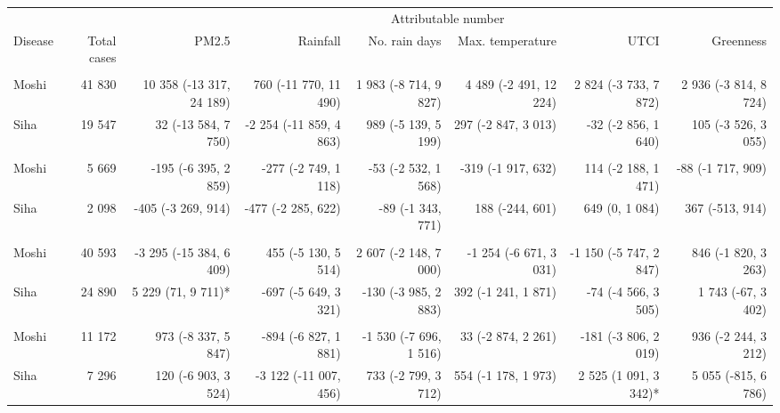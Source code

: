 \begin{table}[t]
\fontsize{12.0pt}{14.4pt}\selectfont
\begin{tabular*}{\linewidth}{@{\extracolsep{\fill}}l|rrrrrrr}
\toprule
 &  & \multicolumn{6}{c}{Attributable number} \\ 
\cmidrule(lr){3-8}
Disease & Total cases & PM2.5 & Rainfall & No. rain days & Max. temperature & UTCI & Greenness \\ 
\midrule\addlinespace[2.5pt]
\multicolumn{8}{l}{Pneumonia, Severe} \\[2.5pt] 
\midrule\addlinespace[2.5pt]
Moshi & 41 830 & 10 358 (-13 317, 24 189)  & 760 (-11 770, 11 490)  & 1 983 (-8 714, 9 827)  & 4 489 (-2 491, 12 224)  & 2 824 (-3 733, 7 872)  & 2 936 (-3 814, 8 724)  \\ 
Siha & 19 547 & 32 (-13 584, 7 750)  & -2 254 (-11 859, 4 863)  & 989 (-5 139, 5 199)  & 297 (-2 847, 3 013)  & -32 (-2 856, 1 640)  & 105 (-3 526, 3 055)  \\ 
\midrule\addlinespace[2.5pt]
\multicolumn{8}{l}{Tuberculosis} \\[2.5pt] 
\midrule\addlinespace[2.5pt]
Moshi & 5 669 & -195 (-6 395, 2 859)  & -277 (-2 749, 1 118)  & -53 (-2 532, 1 568)  & -319 (-1 917, 632)  & 114 (-2 188, 1 471)  & -88 (-1 717, 909)  \\ 
Siha & 2 098 & -405 (-3 269, 914)  & -477 (-2 285, 622)  & -89 (-1 343, 771)  & 188 (-244, 601)  & 649 (0, 1 084)  & 367 (-513, 914)  \\ 
\midrule\addlinespace[2.5pt]
\multicolumn{8}{l}{Skin Infection - Fungal} \\[2.5pt] 
\midrule\addlinespace[2.5pt]
Moshi & 40 593 & -3 295 (-15 384, 6 409)  & 455 (-5 130, 5 514)  & 2 607 (-2 148, 7 000)  & -1 254 (-6 671, 3 031)  & -1 150 (-5 747, 2 847)  & 846 (-1 820, 3 263)  \\ 
Siha & 24 890 & 5 229 (71, 9 711)* & -697 (-5 649, 3 321)  & -130 (-3 985, 2 883)  & 392 (-1 241, 1 871)  & -74 (-4 566, 3 505)  & 1 743 (-67, 3 402)  \\ 
\midrule\addlinespace[2.5pt]
\multicolumn{8}{l}{Malnutrition} \\[2.5pt] 
\midrule\addlinespace[2.5pt]
Moshi & 11 172 & 973 (-8 337, 5 847)  & -894 (-6 827, 1 881)  & -1 530 (-7 696, 1 516)  & 33 (-2 874, 2 261)  & -181 (-3 806, 2 019)  & 936 (-2 244, 3 212)  \\ 
Siha & 7 296 & 120 (-6 903, 3 524)  & -3 122 (-11 007, 456)  & 733 (-2 799, 3 712)  & 554 (-1 178, 1 973)  & 2 525 (1 091, 3 342)* & 5 055 (-815, 6 786)  \\ 

\end{tabular*}
\end{table}
